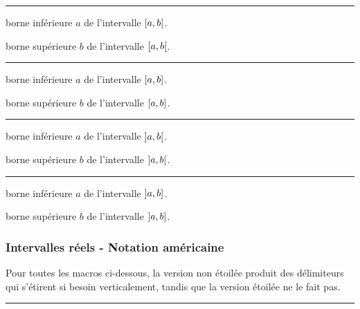 \documentclass[12pt,a4paper]{article}
\theoremstyle{definition}
\newcommand\separation{
	\medskip
	\hfill\rule{0.5\textwidth}{0.75pt}\hfill
	\medskip
}
\begin{document}
\separation





 borne inférieure $a$ de l'intervalle $\intervalCO{a}{b}$.

 borne supérieure $b$ de l'intervalle $\intervalCO{a}{b}$.


\separation




 borne inférieure $a$ de l'intervalle $\intervalC{a}{b}$.

 borne supérieure $b$ de l'intervalle $\intervalC{a}{b}$.


\separation




 borne inférieure $a$ de l'intervalle $\intervalO{a}{b}$.

 borne supérieure $b$ de l'intervalle $\intervalO{a}{b}$.


\separation




 borne inférieure $a$ de l'intervalle $\intervalOC{a}{b}$.

 borne supérieure $b$ de l'intervalle $\intervalOC{a}{b}$.






\subsubsection{Intervalles réels - Notation américaine}

Pour toutes les macros ci-dessous, la version non étoilée produit des délimiteurs qui s'étirent si besoin verticalement, tandis que la version étoilée ne le fait pas.


\separation




\end{document}
